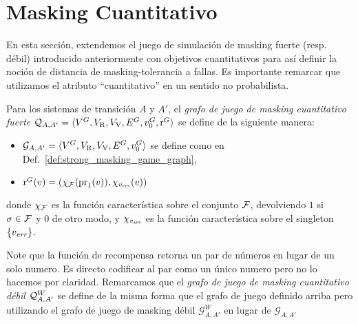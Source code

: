 \section{Masking Cuantitativo} \label{sec:QuantMask}
En esta sección, extendemos el juego de simulación de masking fuerte (resp. débil) introducido anteriormente con objetivos cuantitativos para así definir la noción de distancia de masking-tolerancia a fallas.
Es importante remarcar que utilizamos el atributo  ``cuantitativo'' en un sentido no probabilista.
\begin{defi}  
  Para los sistemas de transición $A$ y $A'$, el \emph{grafo de juego de masking cuantitativo fuerte} 
  $\mathcal{Q}_{A, A'} = \langle V^G, V_{\mathrm{R}}, V_{\mathrm{V}}, E^G,  v_0^G,  \operatorname{r}^G \rangle$ se define de la siguiente manera:
 
\begin{itemize}
\item
  $\mathcal{G}_{A, A'}=\langle V^G, V_{\mathrm{R}}, V_{\mathrm{V}}, E^G, v_0^G \rangle$ se define como en Def.~\ref{def:strong_masking_game_graph},
\item
  $ \operatorname{r}^G(v) = (\chi_{\mathcal{F}}(\operatorname{pr}_{1}(v)), \chi_{v_{\mathit{err}}}(v))$

\end{itemize}
%
donde $\chi_{\mathcal{F}}$ es la función característica sobre el conjunto $\mathcal{F}$, devolviendo $1$ si $\sigma \in \mathcal{F}$ y $0$ de otro modo, y $\chi_{v_{\mathit{err}}}$ es la función característica sobre el singleton $\{v_{\mathit{err}}\}$.
\end{defi}
Note que la función de recompensa retorna un par de números en lugar de un solo numero. Es directo codificar al par como un único numero pero no lo hacemos por claridad. Remarcamos que el
\emph{grafo de juego de masking cuantitativo débil} $\mathcal{Q}^W_{A,A'}$
se define de la misma forma que el grafo de juego definido arriba pero utilizando el grafo de juego de masking débil $\mathcal{G}^W_{A, A'}$ en lugar de 
$\mathcal{G}_{A, A'}$


